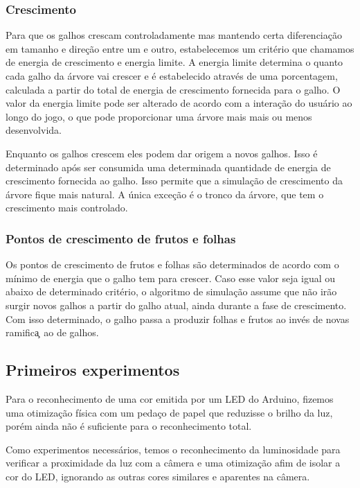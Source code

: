 \documentclass[12pt]{article}
\begin{document}
\subsubsection{Crescimento}
Para que os galhos crescam controladamente mas mantendo certa diferencia\c c\~ao em tamanho e
dire\c c\~ao entre um e outro, estabelecemos um crit\'erio que chamamos de energia de crescimento e energia limite.
A energia limite determina o quanto cada  galho da \'arvore vai crescer e \'e estabelecido atrav\'es de uma porcentagem,
calculada a partir do total de energia de crescimento fornecida para o galho. O valor da energia limite pode
ser alterado de acordo com a intera\c c\~ao do usu\'ario ao longo do jogo, o que pode proporcionar uma \'arvore mais
mais ou menos desenvolvida.

Enquanto os galhos crescem eles podem dar origem a novos galhos. Isso \'e determinado ap\'os ser consumida uma determinada
quantidade de energia de crescimento fornecida ao galho. Isso permite que a simula\c c\~ao de crescimento da \'arvore
fique mais natural. A \'unica exce\c c\~ao \'e o tronco da \'arvore, que tem o crescimento
mais controlado.

\subsubsection{Pontos de crescimento de frutos e folhas}
Os pontos de crescimento de frutos e folhas s\~ao determinados de acordo com o m\'inimo de energia que o galho
tem para crescer. Caso esse valor seja igual ou abaixo de determinado crit\'erio, o algoritmo de simula\c c\~ao assume
que n\~ao ir\~ao surgir novos galhos a partir do galho atual, ainda durante a fase de crescimento. Com isso determinado,
o galho passa a produzir folhas e frutos ao inv\'es de novas ramifica\c~ao de galhos.

\subsection{Primeiros experimentos}
Para o reconhecimento de uma cor emitida por um LED do Arduino, fizemos uma otimiza\c c\~ao f\'isica
com um peda\c co de papel que reduzisse o brilho da luz, por\'em ainda n\~ao \'e suficiente para
o reconhecimento total.

Como experimentos necess\'arios, temos o reconhecimento da luminosidade para verificar
a proximidade da luz com a c\^amera e uma otimiza\c c\~ao afim de isolar a cor do LED,
ignorando as outras cores similares e aparentes na c\^amera.
\end{document}
